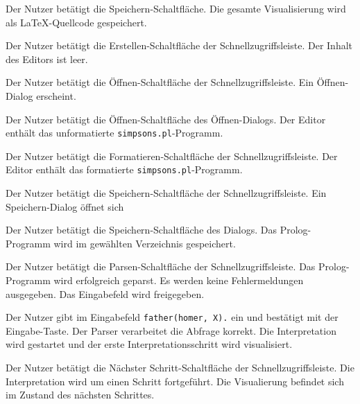 \documentclass[parskip=full,11pt,twoside]{scrartcl}
\begin{document}
{Der Nutzer betätigt die Speichern-Schaltfläche.}
{Die gesamte Visualisierung wird als LaTeX-Quellcode gespeichert.}


{Der Nutzer betätigt die Erstellen-Schaltfläche der Schnellzugriffsleiste.}
{Der Inhalt des Editors ist leer.}

{Der Nutzer betätigt die Öffnen-Schaltfläche der Schnellzugriffsleiste.}
{Ein Öffnen-Dialog erscheint.}

{Der Nutzer betätigt die Öffnen-Schaltfläche des Öffnen-Dialogs.}
{Der Editor enthält das unformatierte \texttt{simpsons.pl}-Programm.}

{Der Nutzer betätigt die Formatieren-Schaltfläche der Schnellzugriffsleiste.}
{Der Editor enthält das formatierte \texttt{simpsons.pl}-Programm.}

{Der Nutzer betätigt die Speichern-Schaltfläche der Schnellzugriffsleiste.}
{Ein Speichern-Dialog öffnet sich}

{Der Nutzer betätigt die Speichern-Schaltfläche des Dialogs.}
{Das Prolog-Programm wird im gewählten Verzeichnis gespeichert.}

{Der Nutzer betätigt die Parsen-Schaltfläche der Schnellzugriffsleiste.}
{Das Prolog-Programm wird erfolgreich geparst. Es werden keine Fehlermeldungen ausgegeben. Das Eingabefeld wird freigegeben.}

{Der Nutzer gibt im Eingabefeld \texttt{father(homer, X).} ein und bestätigt mit der Eingabe-Taste.}
{Der Parser verarbeitet die Abfrage korrekt. Die Interpretation wird gestartet und der erste Interpretationsschritt wird visualisiert.}

{Der Nutzer betätigt die Nächster Schritt-Schaltfläche der Schnellzugriffsleiste.}
{Die Interpretation wird um einen Schritt fortgeführt. Die Visualierung befindet sich im Zustand des nächsten Schrittes.}
\end{document}
